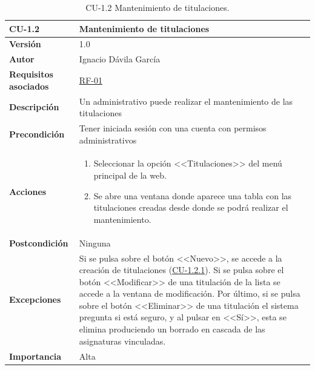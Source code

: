 \begin{table}[p]
\label{table:CU-1.2}
	\centering
	\begin{tabularx}{\linewidth}{ p{} p{} }
		\toprule
		\textbf{CU-1.2}    & \textbf{Mantenimiento de titulaciones}\\
		\toprule
		\textbf{Versión}              & 1.0    \\
		\textbf{Autor}                & Ignacio Dávila García \\
		\textbf{Requisitos asociados} & \hyperref[itm:RF1]{RF-01} \\
		\textbf{Descripción}          & Un administrativo puede realizar el mantenimiento de las titulaciones \\
		\textbf{Precondición}         & Tener iniciada sesión con una cuenta con permisos administrativos \\
		\textbf{Acciones}             &
		\begin{enumerate}
			\def\labelenumi{\arabic{enumi}.}
			\tightlist
			\item Seleccionar la opción <<Titulaciones>> del menú principal de la web.
			\item Se abre una ventana donde aparece una tabla con las titulaciones creadas desde donde se podrá realizar el mantenimiento.
		\end{enumerate}\\
		\textbf{Postcondición}        & Ninguna \\
		\textbf{Excepciones}          & Si se pulsa sobre el botón <<Nuevo>>, se accede a la creación de titulaciones (\hyperref[table:CU-1.2.1]{CU-1.2.1}). Si se pulsa sobre el botón <<Modificar>> de una titulación de la lista se accede a la ventana de modificación. Por último, si se pulsa sobre el botón <<Eliminar>> de una titulación el sistema pregunta si está seguro, y al pulsar en <<Sí>>, esta se elimina produciendo un borrado en cascada de las asignaturas vinculadas. \\
		\textbf{Importancia}          & Alta \\
		\bottomrule
	\end{tabularx}
	\caption{CU-1.2 Mantenimiento de titulaciones.}
\end{table}
\FloatBarrier

